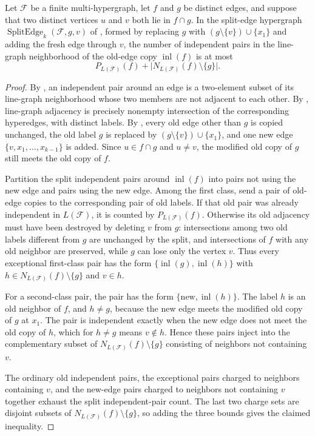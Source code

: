 \begin{helper}
Let $\mathcal F$ be a finite multi-hypergraph, let $f$ and $g$ be distinct
edges, and suppose that two distinct vertices $u$ and $v$ both lie in
$f\cap g$.  In the split-edge hypergraph
$\operatorname{SplitEdge}_k(\mathcal F,g,v)$ of
, formed by replacing $g$ with
$(g\setminus\{v\})\cup\{x_1\}$ and adding the fresh edge through $v$, the
number of independent pairs in the line-graph neighborhood of the old-edge
copy $\operatorname{inl}(f)$ is at most
\[
  P_{L(\mathcal F)}(f)+
  \bigl|N_{L(\mathcal F)}(f)\setminus\{g\}\bigr|.
\]
\end{helper}
\begin{proof}
By , an independent pair around an edge is a
two-element subset of its line-graph neighborhood whose two members are not
adjacent to each other.  By , line-graph
adjacency is precisely nonempty intersection of the corresponding hyperedges,
with distinct labels.  By , every old edge
other than $g$ is copied unchanged, the old label $g$ is replaced by
$(g\setminus\{v\})\cup\{x_1\}$, and one new edge $\{v,x_1,\ldots,x_{k-1}\}$ is
added.  Since $u\in f\cap g$ and $u\ne v$, the modified old copy of $g$ still
meets the old copy of $f$.

Partition the split independent pairs around $\operatorname{inl}(f)$ into
pairs not using the new edge and pairs using the new edge.  Among the first
class, send a pair of old-edge copies to the corresponding pair of old labels.
If that old pair was already independent in $L(\mathcal F)$, it is counted by
$P_{L(\mathcal F)}(f)$.  Otherwise its old adjacency must have been destroyed
by deleting $v$ from $g$: intersections among two old labels different from
$g$ are unchanged by the split, and intersections of $f$ with any old neighbor
are preserved, while $g$ can lose only the vertex $v$.  Thus every exceptional
first-class pair has the form $\{\operatorname{inl}(g),\operatorname{inl}(h)\}$
with $h\in N_{L(\mathcal F)}(f)\setminus\{g\}$ and $v\in h$.

For a second-class pair, the pair has the form
$\{\text{new},\operatorname{inl}(h)\}$.  The label $h$ is an old neighbor of
$f$, and $h\ne g$, because the new edge meets the modified old copy of $g$ at
$x_1$.  The pair is independent exactly when the new edge does not meet the
old copy of $h$, which for $h\ne g$ means $v\notin h$.  Hence these pairs
inject into the complementary subset of
$N_{L(\mathcal F)}(f)\setminus\{g\}$ consisting of neighbors not containing
$v$.

The ordinary old independent pairs, the exceptional pairs charged to neighbors
containing $v$, and the new-edge pairs charged to neighbors not containing
$v$ together exhaust the split independent-pair count.  The last two charge
sets are disjoint subsets of $N_{L(\mathcal F)}(f)\setminus\{g\}$, so adding
the three bounds gives the claimed inequality.
\end{proof}
